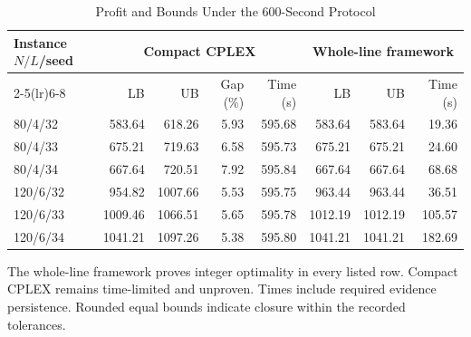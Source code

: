 \begin{table}[!t]
\caption{Profit and Bounds Under the 600-Second Protocol}\label{tab:formal}\centering\small
\begin{tabular}{lrrrrrrr}\toprule
Instance $N/L$/seed & \multicolumn{4}{c}{Compact CPLEX} & \multicolumn{3}{c}{Whole-line framework}\\\cmidrule(lr){2-5}\cmidrule(lr){6-8}& LB & UB & Gap (\%) & Time (s) & LB & UB & Time (s)\\\midrule
80/4/32 & 583.64 & 618.26 & 5.93 & 595.68 & 583.64 & 583.64 & 19.36\\
80/4/33 & 675.21 & 719.63 & 6.58 & 595.73 & 675.21 & 675.21 & 24.60\\
80/4/34 & 667.64 & 720.51 & 7.92 & 595.84 & 667.64 & 667.64 & 68.68\\
120/6/32 & 954.82 & 1007.66 & 5.53 & 595.75 & 963.44 & 963.44 & 36.51\\
120/6/33 & 1009.46 & 1066.51 & 5.65 & 595.78 & 1012.19 & 1012.19 & 105.57\\
120/6/34 & 1041.21 & 1097.26 & 5.38 & 595.80 & 1041.21 & 1041.21 & 182.69\\
\bottomrule\end{tabular}
\par\smallskip\begin{minipage}{\textwidth}\footnotesize The whole-line framework proves integer optimality in every listed row. Compact CPLEX remains time-limited and unproven. Times include required evidence persistence. Rounded equal bounds indicate closure within the recorded tolerances.\end{minipage}
\end{table}

